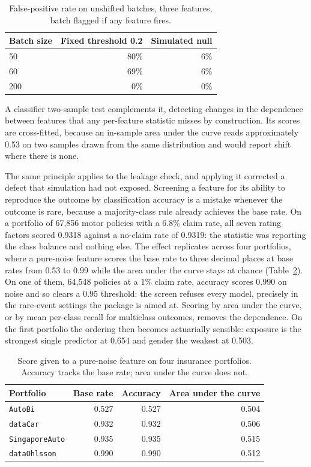\documentclass[11pt,a4paper]{article}
\begin{document}
\begin{table}[ht]
\centering
\caption{False-positive rate on unshifted batches, three features, batch
flagged if any feature fires.}
\label{tab:psi}
\begin{tabular}{lrr}
\toprule
Batch size & Fixed threshold 0.2 & Simulated null \\
\midrule
50   & 80\% & 6\% \\
60   & 69\% & 6\% \\
200  & 0\%  & 0\% \\
\bottomrule
\end{tabular}
\end{table}

A classifier two-sample test \citep{lopezpaz2017} complements it, detecting
changes in the dependence between features that any per-feature statistic
misses by construction. Its scores are cross-fitted, because an in-sample area
under the curve reads approximately 0.53 on two samples drawn from the same
distribution and would report shift where there is none.

The same principle applies to the leakage check, and applying it corrected a
defect that simulation had not exposed. Screening a feature for its ability to
reproduce the outcome by classification accuracy is a mistake whenever the
outcome is rare, because a majority-class rule already achieves the base rate.
On a portfolio of 67{,}856 motor policies \citep{insuranceData} with a 6.8\%
claim rate, all seven rating factors scored 0.9318 against a no-claim rate of
0.9319: the statistic was reporting the class balance and nothing else. The
effect replicates across four portfolios, where a pure-noise feature scores the
base rate to three decimal places at base rates from 0.53 to 0.99 while the
area under the curve stays at chance (Table~\ref{tab:proxy}). On one of them,
64{,}548 policies at a 1\% claim rate, accuracy scores 0.990 on noise and so
clears a 0.95 threshold: the screen refuses every model, precisely in the
rare-event settings the package is aimed at. Scoring by area under the curve,
or by mean per-class recall for multiclass outcomes, removes the dependence. On
the first portfolio the ordering then becomes actuarially sensible: exposure is
the strongest single predictor at 0.654 and gender the weakest at 0.503.

\begin{table}[ht]
\centering
\caption{Score given to a pure-noise feature on four insurance portfolios.
Accuracy tracks the base rate; area under the curve does not.}
\label{tab:proxy}
\begin{tabular}{lrrr}
\toprule
Portfolio & Base rate & Accuracy & Area under the curve \\
\midrule
\texttt{AutoBi}        & 0.527 & 0.527 & 0.504 \\
\texttt{dataCar}       & 0.932 & 0.932 & 0.506 \\
\texttt{SingaporeAuto} & 0.935 & 0.935 & 0.515 \\
\texttt{dataOhlsson}   & 0.990 & 0.990 & 0.512 \\
\bottomrule
\end{tabular}
\end{table}
\end{document}
